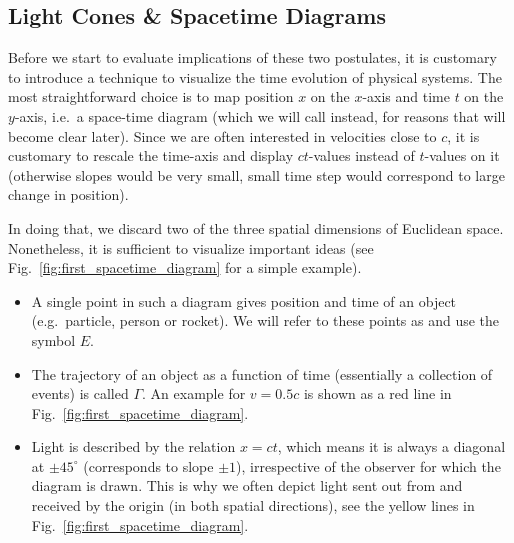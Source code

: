 \documentclass[../relativity_main.tex]{subfiles}
\begin{document}
		\subsection{Light Cones \& Spacetime Diagrams}
Before we start to evaluate implications of these two postulates, it is customary to introduce a technique to visualize the time evolution of physical systems. The most straightforward choice is to map position $x$ on the $x$-axis and time $t$ on the $y$-axis, i.e.~a space-time diagram (which we will call  instead, for reasons that will become clear later). Since we are often interested in velocities close to $c$, it is customary to rescale the time-axis and display $ct$-values instead of $t$-values on it (otherwise slopes would be very small, small time step would correspond to large change in position).

In doing that, we discard two of the three spatial dimensions of Euclidean space. Nonetheless, it is sufficient to visualize important ideas (see Fig.~\ref{fig:first_spacetime_diagram} for a simple example).
\begin{itemize}
	\item A single point in such a diagram gives position and time of an object (e.g.~particle, person or rocket). We will refer to these points as  and use the symbol $E$.


	\item The trajectory of an object as a function of time (essentially a collection of events) is called  $\Gamma$. An example for $v = 0.5 c$ is shown as a red line in Fig.~\ref{fig:first_spacetime_diagram}.


	\item Light is described by the relation $x = ct$, which means it is always a diagonal at $\pm 45^\circ$ (corresponds to slope $\pm 1$), irrespective of the observer for which the diagram is drawn. This is why we often depict light sent out from and received by the origin (in both spatial directions), see the yellow lines in Fig.~\ref{fig:first_spacetime_diagram}.
\end{itemize}
\end{document}
